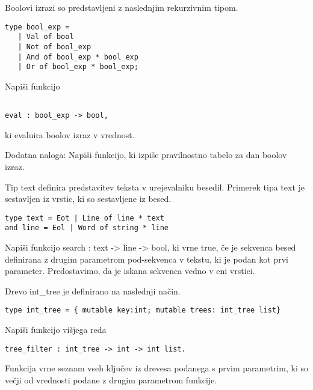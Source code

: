\begin{ex}
Boolovi izrazi so predstavljeni z naslednjim rekurzivnim tipom.   

\begin{lstlisting}
type bool_exp =
   | Val of bool
   | Not of bool_exp
   | And of bool_exp * bool_exp
   | Or of bool_exp * bool_exp;

\end{lstlisting}
Napi\v si funkcijo
\begin{lstlisting}

eval : bool_exp -> bool, 
\end{lstlisting}

ki evaluira boolov izraz v vrednost.   

Dodatna naloga: Napi\v si funkcijo, ki izpi\v se pravilnostno tabelo
za dan boolov izraz.


\end{ex} 
\begin{ex}
  Tip text definira predstavitev teksta v urejevalniku
  besedil. Primerek tipa text je sestavljen iz vrstic, ki so
  sestavljene iz besed.

\begin{lstlisting}
type text = Eot | Line of line * text
and line = Eol | Word of string * line
\end{lstlisting}

  Napi\v si funkcijo search : text -> line -> bool, ki vrne true, \v
  ce je sekvenca besed definirana z drugim parametrom pod-sekvenca v
  tekstu, ki je podan kot prvi parameter. Predostavimo, da je iskana
  sekvenca vedno v eni vrstici.


\end{ex} 
\begin{ex}
  Drevo int\_tree je definirano na naslednji na\v cin.

\begin{lstlisting}
type int_tree = { mutable key:int; mutable trees: int_tree list}
\end{lstlisting}

  Napi\v si funkcijo vi\v sjega reda

\begin{lstlisting}
tree_filter : int_tree -> int -> int list.
\end{lstlisting}

  Funkcija vrne seznam vseh klju\v cev iz drevesa podanega s prvim
  parametrim, ki so ve\v cji od vrednosti podane z drugim parametrom
  funkcije.


\end{ex} 

